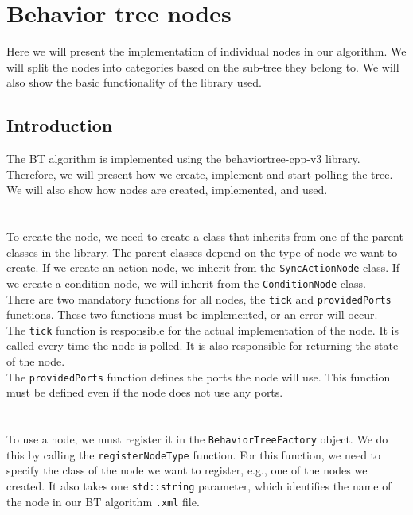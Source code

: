 \section{Behavior tree nodes}
    Here we will present the implementation of individual nodes in our algorithm. We will split the nodes into categories based on the sub-tree they belong to. We will also show the basic functionality of the library used.
    \subsection{Introduction}
        The BT algorithm is implemented using the behaviortree-cpp-v3 library. Therefore, we will present how we create, implement and start polling the tree. We will also show how nodes are created, implemented, and used.\\\\
        \\
            To create the node, we need to create a class that inherits from one of the parent classes in the library. The parent classes depend on the type of node we want to create. If we create an action node, we inherit from the \texttt{SyncActionNode} class. If we create a condition node, we will inherit from the \texttt{ConditionNode} class.\\
            There are two mandatory functions for all nodes, the \texttt{tick} and \texttt{providedPorts} functions. These two functions must be implemented, or an error will occur.\\
            The \texttt{tick} function is responsible for the actual implementation of the node. It is called every time the node is polled. It is also responsible for returning the state of the node.\\
            The \texttt{providedPorts} function defines the ports the node will use. This function must be defined even if the node does not use any ports.\\\\
        \\
            To use a node, we must register it in the \texttt{BehaviorTreeFactory} object. We do this by calling the \texttt{registerNodeType} function. For this function, we need to specify the class of the node we want to register, e.g., one of the nodes we created. It also takes one \texttt{std::string} parameter, which identifies the name of the node in our BT algorithm \texttt{.xml} file.\\\\
